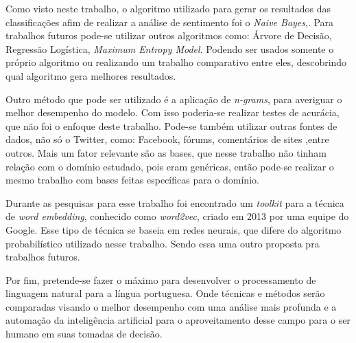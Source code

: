 Como visto neste trabalho, o algoritmo utilizado para gerar os resultados das classificações afim de realizar a análise de sentimento foi o \textit{Naive Bayes},. Para trabalhos futuros pode-se utilizar outros algoritmos como: Árvore de Decisão, Regressão Logística, \textit{Maximum Entropy Model}. Podendo ser usados somente o próprio algoritmo ou realizando um trabalho comparativo entre eles, descobrindo qual algoritmo gera melhores resultados.

Outro método que pode ser utilizado é a aplicação de \textit{n-grams}, para averiguar o melhor desempenho do modelo. Com isso poderia-se realizar testes de acurácia, que não foi o enfoque deste trabalho. Pode-se também utilizar outras fontes de dados, não só o Twitter, como: Facebook, fórums, comentários de sites ,entre outros. Mais um fator relevante são as bases, que nesse trabalho não tinham relação com o domínio estudado, pois eram genéricas, então pode-se realizar o mesmo trabalho com bases feitas específicas para o domínio.

Durante as pesquisas para esse trabalho foi encontrado um \textit{toolkit}  para a técnica de \textit{word embedding}, conhecido como \textit{word2vec}, criado em 2013 por uma equipe do Google. Esse tipo de técnica se baseia em redes neurais, que difere do algoritmo probabilístico utilizado nesse trabalho. Sendo essa uma outro proposta pra trabalhos futuros.

Por fim, pretende-se fazer o máximo para desenvolver o  processamento de linguagem natural para a língua portuguesa. Onde técnicas e métodos serão comparadas visando o melhor desempenho com uma análise mais profunda e a automação da inteligência artificial para o aproveitamento desse campo para o ser humano em suas tomadas de decisão. 